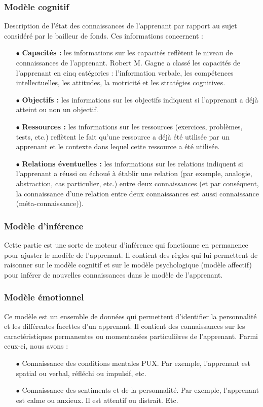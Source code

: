 \subsubsection{Modèle cognitif}
Description de l’état des connaissances de l’apprenant par rapport au sujet considéré par le bailleur de fonds. Ces informations concernent :
\begin{itemize}
	\item[$\bullet$] \textbf{Capacités :} les informations sur les capacités reflètent le niveau de connaissances de l'apprenant. Robert M. Gagne a classé les capacités de l’apprenant en cinq catégories : l’information verbale, les compétences intellectuelles, les attitudes, la motricité et les stratégies cognitives.
	\item[$\bullet$] \textbf{Objectifs :} les informations sur les objectifs indiquent si l'apprenant a déjà atteint ou non un objectif.
	\item[$\bullet$] \textbf{Ressources :} les informations sur les ressources (exercices, problèmes, tests, etc.) reflètent le fait qu'une ressource a déjà été utilisée par un apprenant et le contexte dans lequel cette ressource a été utilisée.
	\item[$\bullet$] \textbf{Relations éventuelles :} les informations sur les relations indiquent si l'apprenant a réussi ou échoué à établir une relation (par exemple, analogie, abstraction, cas particulier, etc.) entre deux connaissances (et par conséquent, la connaissance d'une relation entre deux connaissances est aussi connaissance (méta-connaissance)).
\end{itemize}

\subsubsection{Modèle d'inférence}
Cette partie est une sorte de moteur d’inférence qui fonctionne en permanence pour ajuster le modèle de l’apprenant. Il contient des règles qui lui permettent de raisonner sur le modèle cognitif et sur le modèle psychologique (modèle affectif) pour inférer de nouvelles connaissances dans le modèle de l’apprenant.

\subsubsection{Modèle émotionnel}
Ce modèle est un ensemble de données qui permettent d'identifier la personnalité et les différentes facettes d'un apprenant. Il contient des connaissances sur les caractéristiques permanentes ou momentanées particulières de l’apprenant. Parmi ceux-ci, nous avons :
\begin{itemize}
	\item[$\bullet$] Connaissance des conditions mentales PUX. Par exemple, l'apprenant est spatial ou verbal, réfléchi ou impulsif, etc.
	\item[$\bullet$] Connaissance des sentiments et de la personnalité. Par exemple, l'apprenant est calme ou anxieux. Il est attentif ou distrait. Etc.
\end{itemize}

